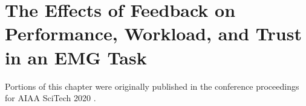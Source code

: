 \chapter{The Effects of Feedback on Performance, Workload, and Trust in an EMG Task}
\label{chap:emg}

Portions of this chapter were originally published in the conference proceedings for AIAA SciTech 2020 \citep{doi:10.2514/6.2020-1110}.





% 


